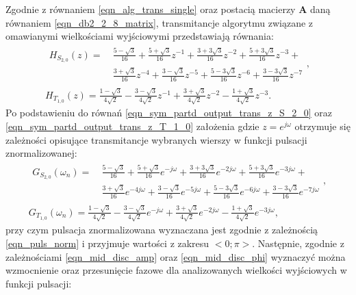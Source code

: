 Zgodnie z równaniem \eqref{eqn_alg_trans_single} oraz postacią macierzy $\mathbf{A}$ daną równaniem \eqref{eqn_db2_2_8_matrix}, transmitancje algorytmu związane z omawianymi wielkościami wyjściowymi przedstawiają równania:
\begin{gather}
\begin{split}
H_{S_{2,0}} \left( z \right) = ~
& \frac{5 - \sqrt{3}}{16} + \frac{5 + \sqrt{3}}{16} z^{-1} + \frac{3 + 3 \sqrt{3}}{16} z^{-2} + \frac{5 + 3 \sqrt{3}}{16} z^{-3} + \\
& \frac{3 + \sqrt{3}}{16} z^{-4} + \frac{3 - \sqrt{3}}{16} z^{-5} + \frac{5 - 3 \sqrt{3}}{16} z^{-6} + \frac{3 - 3 \sqrt{3}}{16} z^{-7}
\end{split}
\label{eqn_sym_partd_output_trans_z_S_2_0}, \\
H_{T_{1,0}} \left( z \right) = \frac{1 - \sqrt{3}}{4 \sqrt{2}} - \frac{3 - \sqrt{3}}{4 \sqrt{2}} z^{-1} + \frac{3 + \sqrt{3}}{4 \sqrt{2}} z^{-2} - \frac{1 + \sqrt{3}}{4 \sqrt{2}} z^{-3} \label{eqn_sym_partd_output_trans_z_T_1_0}.
\end{gather}
Po podstawieniu do równań \eqref{eqn_sym_partd_output_trans_z_S_2_0} oraz \eqref{eqn_sym_partd_output_trans_z_T_1_0} założenia gdzie $z = e^{j\omega}$ otrzymuje się zależności opisujące transmitancje wybranych wierszy w funkcji pulsacji znormalizowanej:
\begin{gather}
\begin{split}
G_{S_{2,0}} \left( \omega_{n} \right) = ~
& \frac{5 - \sqrt{3}}{16} + \frac{5 + \sqrt{3}}{16} e^{-j\omega} + \frac{3 + 3 \sqrt{3}}{16} e^{-2j\omega} + \frac{5 + 3 \sqrt{3}}{16} e^{-3j\omega} + \\
& \frac{3 + \sqrt{3}}{16} e^{-4j\omega} + \frac{3 - \sqrt{3}}{16} e^{-5j\omega} + \frac{5 - 3 \sqrt{3}}{16} e^{-6j\omega} + \frac{3 - 3 \sqrt{3}}{16} e^{-7j\omega}
\end{split}
\label{eqn_sym_partd_output_trans_wn_S_2_0}, \\
G_{T_{1,0}} \left( \omega_{n} \right) = \frac{1 - \sqrt{3}}{4 \sqrt{2}} - \frac{3 - \sqrt{3}}{4 \sqrt{2}} e^{-j\omega} + \frac{3 + \sqrt{3}}{4 \sqrt{2}} e^{-2j\omega} - \frac{1 + \sqrt{3}}{4 \sqrt{2}} e^{-3j\omega} \label{eqn_sym_partd_output_trans_wn_T_1_0},
\end{gather}
przy czym pulsacja znormalizowana wyznaczana jest zgodnie z zależnością \eqref{eqn_puls_norm} i przyjmuje wartości z zakresu $<0;\pi>$. Następnie, zgodnie z zależnościami \eqref{eqn_mid_disc_amp} oraz \eqref{eqn_mid_disc_phi} wyznaczyć można wzmocnienie oraz przesunięcie fazowe dla analizowanych wielkości wyjściowych w funkcji pulsacji:
